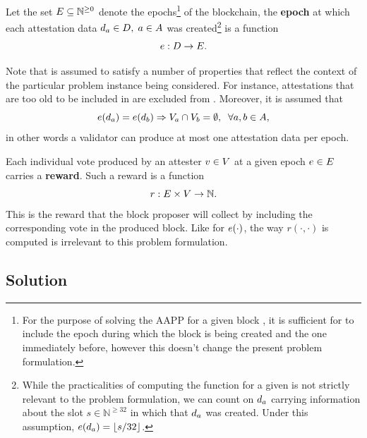 \documentclass{article}
\begin{document}
Let the set $E \subseteq \mathbb{N}^{\geq 0}$ denote the
epochs\footnote{For the purpose of solving the AAPP for a given block \block,
it is sufficient for \epochs{} to include the epoch during which the block is
being created and the one immediately before, however this doesn't change the
present problem formulation.} of the blockchain, the \textbf{epoch} at which
each attestation data $d_{a} \in D,\; a \in
A$ was created\footnote{While the practicalities of computing the
\epoch{\data{\attestation}} function for a given \data{\attestation} is not
strictly relevant to the problem formulation, we can count on
$d_{a}$ carrying information about the slot $s \in
\mathbb{N}^{\geq 32}$ in which that $d_{a}$ was created. Under
this assumption, $e(d_{a}) = \lfloor s/32\rfloor$.} is a
function
\begin{equation}
  e: D \rightarrow E.
\end{equation}

Note that \attestations{} is assumed to satisfy a number of properties that
reflect the context of the particular problem instance being considered. For
instance, attestations that are too old to be included in \block{} are excluded
from \attestations{}.  Moreover, it is assumed that
%
\begin{equation}
  e(d_{a}) = e(d_{b}) \Rightarrow V_{a} \cap
  V_{b} = \emptyset,\;\; \forall a, b \in A{},
\end{equation}
%
in other words a validator can produce at most one attestation data per epoch.

\newcommand{\reward}[2]{\ensuremath{r(#1, #2)}}

Each individual vote produced by an attester $v \in
V$ at a given epoch $e \in E$ carries a \textbf{reward}. Such
a reward is a function
%
\begin{equation}
  r: E \times V \rightarrow \mathbb{N}.
\end{equation} 
%
This is the reward that the block proposer will collect by including the
corresponding vote in the produced block. Like for $e(\cdot)$, the
way $\reward{\cdot}{\cdot}$ is computed is irrelevant to this problem
formulation.

\subsection{Solution}
\end{document}
